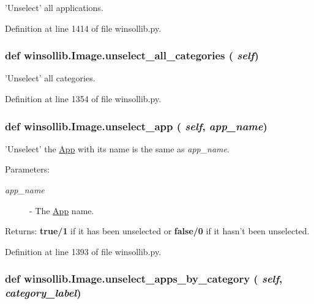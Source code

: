 'Unselect' all applications. 



Definition at line 1414 of file winsollib.py.\hypertarget{classwinsollib_1_1Image_0f85fd5271bfbcf33e922efa13f3f142}{
\subsubsection[unselect\_\-all\_\-categories]{\setlength{\rightskip}{0pt plus 5cm}def winsollib.Image.unselect\_\-all\_\-categories ( {\em self})}}
\label{classwinsollib_1_1Image_0f85fd5271bfbcf33e922efa13f3f142}


'Unselect' all categories. 



Definition at line 1354 of file winsollib.py.\hypertarget{classwinsollib_1_1Image_7039df04ad747bf0a5ab24a7cd7c4d2e}{
\subsubsection[unselect\_\-app]{\setlength{\rightskip}{0pt plus 5cm}def winsollib.Image.unselect\_\-app ( {\em self},  {\em app\_\-name})}}
\label{classwinsollib_1_1Image_7039df04ad747bf0a5ab24a7cd7c4d2e}


'Unselect' the \hyperlink{classwinsollib_1_1App}{App} with its name is the same as {\em app\_\-name\/}. 

\begin{Desc}
\item[Parameters:]
\begin{description}
\item[{\em app\_\-name}]- The \hyperlink{classwinsollib_1_1App}{App} name. \end{description}
\end{Desc}
\begin{Desc}
\item[Returns:]{\bf true/1} if it has been unselected or {\bf false/0} if it hasn't been unselected. \end{Desc}


Definition at line 1393 of file winsollib.py.\hypertarget{classwinsollib_1_1Image_a355ad7d6f40795aa7b6d276f2f07e85}{
\subsubsection[unselect\_\-apps\_\-by\_\-category]{\setlength{\rightskip}{0pt plus 5cm}def winsollib.Image.unselect\_\-apps\_\-by\_\-category ( {\em self},  {\em category\_\-label})}}
\label{classwinsollib_1_1Image_a355ad7d6f40795aa7b6d276f2f07e85}


